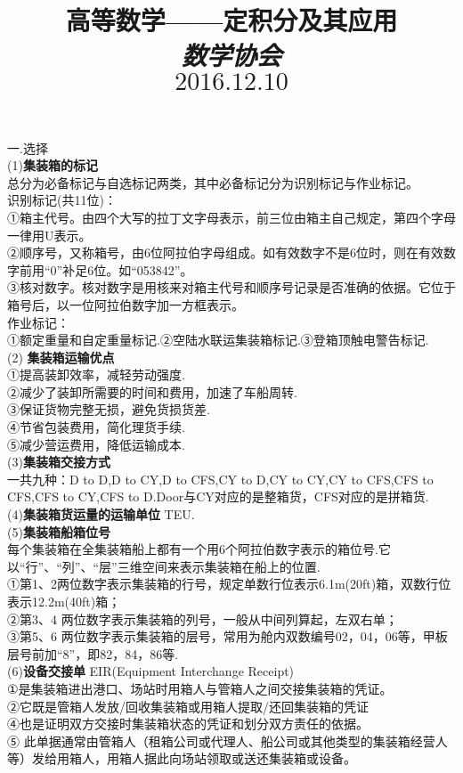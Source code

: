 \documentclass[UTF8]{ctexart}
\date{}
\title{\textbf{\small 高等数学——定积分及其应用 \\  \emph{数学协会}\\$2016.12.10$}}
\begin{document}
\thispagestyle{fancy}
\noindent 一.选择
\\ (1)\small  \textbf{集装箱的标记}\\ \small 总分为必备标记与自选标记两类，其中必备标记分为识别标记与作业标记。
\\识别标记(共11位)：\\ ①箱主代号。由四个大写的拉丁文字母表示，前三位由箱主自己规定，第四个字母一律用U表示。
\\ ②顺序号，又称箱号，由6位阿拉伯字母组成。如有效数字不是6位时，则在有效数字前用“0”补足6位。如“053842”。
\\ ③核对数字。核对数字是用核来对箱主代号和顺序号记录是否准确的依据。它位于箱号后，以一位阿拉伯数字加一方框表示。
\\作业标记：\\ ①额定重量和自定重量标记.②空陆水联运集装箱标记.③登箱顶触电警告标记.
\\ (2) \textbf{集装箱运输优点}\\ \small ①提高装卸效率，减轻劳动强度.
\\ ②减少了装卸所需要的时间和费用，加速了车船周转.
\\ ③保证货物完整无损，避免货损货差.
\\ ④节省包装费用，简化理货手续.
\\ ⑤减少营运费用，降低运输成本.
\\(3)\small  \textbf{集装箱交接方式}\\ \small 一共九种：D to D,D to CY,D to CFS,CY to D,CY to CY,CY to CFS,CFS to CFS,CFS to CY,CFS to D.Door与CY对应的是整箱货，CFS对应的是拼箱货.
\\ (4)\small  \textbf{集装箱货运量的运输单位} \small TEU.
\\(5)\small  \textbf{集装箱船箱位号}\\ \small 每个集装箱在全集装箱船上都有一个用6个阿拉伯数字表示的箱位号.它以“行”、“列”、“层”三维空间来表示集装箱在船上的位置.\\ ①第1、2两位数字表示集装箱的行号，规定单数行位表示6.1m(20ft)箱，双数行位表示12.2m(40ft)箱；\\ ②第3、4 两位数字表示集装箱的列号，一般从中间列算起，左双右单；\\ ③第5、6 两位数字表示集装箱的层号，常用为舱内双数编号02，04，06等，甲板层号前加“8”，即82，84，86等.
\\(6)\small  \textbf{设备交接单} \small EIR(Equipment   Interchange  Receipt)
\\ ①是集装箱进出港口、场站时用箱人与管箱人之间交接集装箱的凭证。
\\ ②它既是管箱人发放/回收集装箱或用箱人提取/还回集装箱的凭证
\\  ④也是证明双方交接时集装箱状态的凭证和划分双方责任的依据。
\\⑤ 此单据通常由管箱人（租箱公司或代理人、船公司或其他类型的集装箱经营人等）发给用箱人，用箱人据此向场站领取或送还集装箱或设备。
\end{document}
